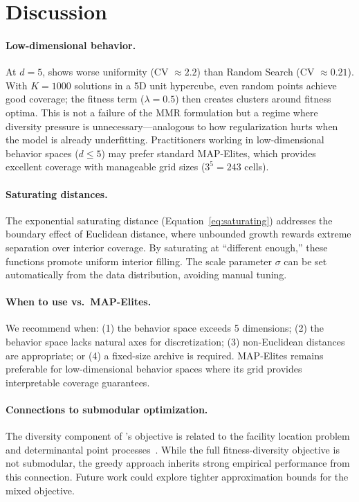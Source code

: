 \section{Discussion}
\label{sec:discussion}

\paragraph{Low-dimensional behavior.}
At $d = 5$, \mmr shows worse uniformity (CV $\approx 2.2$) than Random Search (CV $\approx 0.21$).
With $K = 1000$ solutions in a 5D unit hypercube, even random points achieve good coverage; the fitness term ($\lambda = 0.5$) then creates clusters around fitness optima.
This is not a failure of the MMR formulation but a regime where diversity pressure is unnecessary---analogous to how regularization hurts when the model is already underfitting.
Practitioners working in low-dimensional behavior spaces ($d \leq 5$) may prefer standard MAP-Elites, which provides excellent coverage with manageable grid sizes ($3^5 = 243$ cells).

\paragraph{Saturating distances.}
The exponential saturating distance (Equation~\ref{eq:saturating}) addresses the boundary effect of Euclidean distance, where unbounded growth rewards extreme separation over interior coverage.
By saturating at ``different enough,'' these functions promote uniform interior filling.
The scale parameter $\sigma$ can be set automatically from the data distribution, avoiding manual tuning.

\paragraph{When to use \mmr vs.\ MAP-Elites.}
We recommend \mmr when: (1) the behavior space exceeds 5 dimensions; (2) the behavior space lacks natural axes for discretization; (3) non-Euclidean distances are appropriate; or (4) a fixed-size archive is required.
MAP-Elites remains preferable for low-dimensional behavior spaces where its grid provides interpretable coverage guarantees.

\paragraph{Connections to submodular optimization.}
The diversity component of \mmr's objective is related to the facility location problem and determinantal point processes~\cite{kulesza2012determinantal}.
While the full fitness-diversity objective is not submodular, the greedy approach inherits strong empirical performance from this connection.
Future work could explore tighter approximation bounds for the mixed objective.

